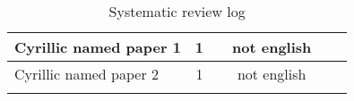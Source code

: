 \begin{landscape}
\begin{longtable}{ | p{15cm} | *{5}{c|} }
        Cyrillic named paper 1                                                                                                                                    & 1         &        & not english &     &          \\ \hline 
        Cyrillic named paper 2                                                                                                                                    & 1         &        & not english &     &          \\ \hline 
        \caption{Systematic review log}
        \label{table:Systematic_Review_Log}
    \end{longtable}
\end{landscape}



